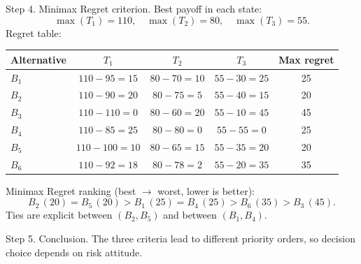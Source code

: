 \begin{ExamProblems}
		Step 4. Minimax Regret criterion.
		Best payoff in each state:
		\[
		\max(T_1)=110,\quad \max(T_2)=80,\quad \max(T_3)=55.
		\]
		Regret table:
		\begin{center}
			\begin{tabular}{l c c c c}
				\toprule
				Alternative & $T_1$ & $T_2$ & $T_3$ & Max regret \\
				\midrule
				$B_1$ & $110-95=15$ & $80-70=10$ & $55-30=25$ & 25 \\
				$B_2$ & $110-90=20$ & $80-75=5$ & $55-40=15$ & 20 \\
				$B_3$ & $110-110=0$ & $80-60=20$ & $55-10=45$ & 45 \\
				$B_4$ & $110-85=25$ & $80-80=0$ & $55-55=0$ & 25 \\
				$B_5$ & $110-100=10$ & $80-65=15$ & $55-35=20$ & 20 \\
				$B_6$ & $110-92=18$ & $80-78=2$ & $55-20=35$ & 35 \\
				\bottomrule
			\end{tabular}
		\end{center}
		Minimax Regret ranking (best $\to$ worst, lower is better):
		\[
		B_2\,(20)=B_5\,(20)>B_1\,(25)=B_4\,(25)>B_6\,(35)>B_3\,(45).
		\]
		Ties are explicit between $(B_2,B_5)$ and between $(B_1,B_4)$.

		Step 5. Conclusion.
		The three criteria lead to different priority orders, so decision choice depends on risk attitude.
	\end{ExamProblems}

